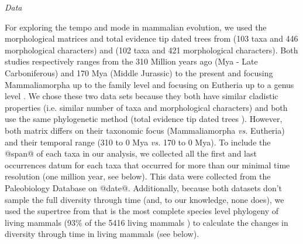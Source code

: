 \documentclass[12pt,letterpaper]{article}
\renewcommand{\subsection}[1]{%
\bigskip
\begin{center}
\begin{large}
\normalfont\itshape #1
\end{large}
\end{center}}
\begin{document}
\subsection{Data}
For exploring the tempo and mode in mammalian evolution, we used the morphological matrices and total evidence tip dated trees \cite{ronquista2012} from \cite{MEE3:MEE312084} (103 taxa and 446 morphological characters) and \cite{beckancient2014} (102 taxa and 421 morphological characters). Both studies respectively ranges from the 310 Million years ago (Mya - Late Carboniferous) and 170 Mya (Middle Jurassic) to the present and focusing Mammaliamorpha up to the family level \cite{MEE3:MEE312084} and focusing on Eutheria up to a genus level \cite{beckancient2014}. We chose these two data sets because they both have similar cladistic properties (i.e. similar number of taxa and morphological characters) and both use the same phylogenetic method (total evidence tip dated trees \cite{ronquista2012}). However, both matrix differs on their taxonomic focus (Mammaliamorpha \textit{vs.} Eutheria) and their temporal range (310 to 0 Mya \textit{vs.} 170 to 0 Mya). To include the @span@ of each taxa in our analysis, we collected all the first and last occurrences datum for each taxa that occurred for more than our minimal time resolution (one million year, see below). This data were collected from the Paleobiology Database on @date@. Additionally, because both datasets don't sample the full diversity through time (and, to our knowledge, none does), we used the supertree from \cite{fritzdiversity2013} that is the most complete species level phylogeny of living mammals (93\% of the 5416 living mammals \cite{wilson2005mammal}) to calculate the changes in diversity through time in living mammals (see below).
\end{document}
